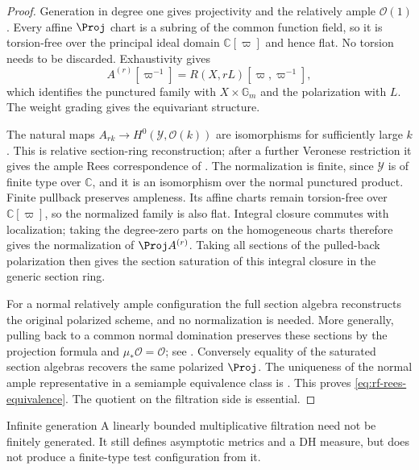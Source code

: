 \begin{proof}
Generation in degree one gives projectivity and the relatively ample $\mathcal O(1)$. Every affine $\Proj$ chart is a subring of the common function field, so it is torsion-free over the principal ideal domain $\mathbb C[\varpi]$ and hence flat. No torsion needs to be discarded. Exhaustivity gives
\[
 A^{(r)}[\varpi^{-1}]
       =R(X,rL)[\varpi,\varpi^{-1}],
\]
which identifies the punctured family with $X\times\mathbb G_m$ and the polarization with $L$. The weight grading gives the equivariant structure.

The natural maps $A_{rk}\to H^0(\mathcal Y,\mathcal O(k))$ are isomorphisms for sufficiently large $k$. This is relative section-ring reconstruction; after a further Veronese restriction it gives the ample Rees correspondence of \cite[Proposition~2.15]{BHJ17}. The normalization is finite, since $\mathcal Y$ is of finite type over $\mathbb C$, and it is an isomorphism over the normal punctured product. Finite pullback preserves ampleness. Its affine charts remain torsion-free over $\mathbb C[\varpi]$, so the normalized family is also flat. Integral closure commutes with localization; taking the degree-zero parts on the homogeneous charts therefore gives the normalization of $\Proj A^{(r)}$. Taking all sections of the pulled-back polarization then gives the section saturation of this integral closure in the generic section ring.

For a normal relatively ample configuration the full section algebra reconstructs the original polarized scheme, and no normalization is needed. More generally, pulling back to a common normal domination preserves these sections by the projection formula and $\mu_*\mathcal O=\mathcal O$; see \cite[Lemma~2.13]{BHJ17}. Conversely equality of the saturated section algebras recovers the same polarized $\Proj$. The uniqueness of the normal ample representative in a semiample equivalence class is \cite[Proposition~2.30]{BJ22}. This proves \eqref{eq:rf-rees-equivalence}. The quotient on the filtration side is essential.
\end{proof}

\begin{samepage}
\begin{warning}{Infinite generation}\label{warn:rf-infinite-generation}
A linearly bounded multiplicative filtration need not be finitely generated. It still defines asymptotic metrics and a DH measure, but  does not produce a finite-type test configuration from it.
\end{warning}
\end{samepage}

